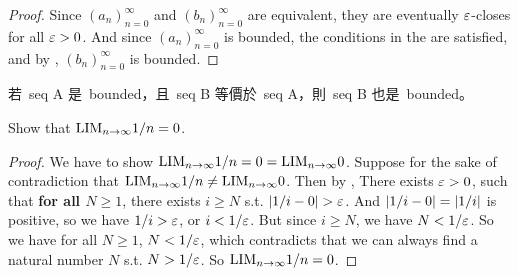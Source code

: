 \begin{proof}
Since \((a_n)_{n = 0}^{\infty}\) and \((b_n)_{n = 0}^{\infty}\) are equivalent, they are eventually \(\varepsilon\)-closes for all \(\varepsilon > 0\).
And since \((a_n)_{n = 0}^{\infty}\) is bounded, the conditions in the  are satisfied, and by , \((b_n)_{n = 0}^{\infty}\) is bounded.
\end{proof}

\begin{note}
若\ seq A 是\ bounded，且\ seq B 等價於\ seq A，則\ seq B 也是\ bounded。
\end{note}

\begin{exercise} \label{exercise 5.3.5}
Show that \(\text{LIM}_{n \to \infty} 1 / n = 0\).
\end{exercise}

\begin{proof}
We have to show \(\text{LIM}_{n \to \infty} 1 / n = 0 = \text{LIM}_{n \to \infty} 0\).
Suppose for the sake of contradiction that \(\text{LIM}_{n \to \infty} 1 / n \ne \text{LIM}_{n \to \infty} 0\).
Then by , There exists \(\varepsilon > 0\), such that \textbf{for all \(N \ge 1\)}, there exists \(i \ge N\) s.t. \(\lvert1/i - 0\rvert > \varepsilon\).
And \(\lvert1/i - 0\rvert = \lvert1/i\rvert\) is positive, so we have \(1/i > \varepsilon\), or \(i < 1/\varepsilon\).
But since \(i \ge N\), we have \(N < 1/\varepsilon\).
So we have for all \(N \ge 1\), \(N < 1/\varepsilon\), which contradicts  that we can always find a natural number \(N\) s.t. \(N > 1/\varepsilon\).
So \(\text{LIM}_{n \to \infty} 1 / n = 0\).
\end{proof}
